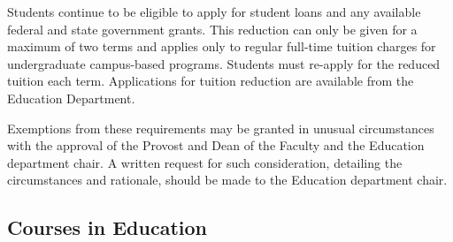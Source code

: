 \documentclass[
  letterpaper,
]{scrbook}
\begin{document}
Students continue to be eligible to apply for student loans and any
available federal and state government grants. This reduction can only
be given for a maximum of two terms and applies only to regular
full-time tuition charges for undergraduate campus-based programs.
Students must re-apply for the reduced tuition each term. Applications
for tuition reduction are available from the Education Department.

Exemptions from these requirements may be granted in unusual
circumstances with the approval of the Provost and Dean of the Faculty
and the Education department chair. A written request for such
consideration, detailing the circumstances and rationale, should be made
to the Education department chair.

\subsection{Courses in Education}\label{courses-in-education}
\end{document}
